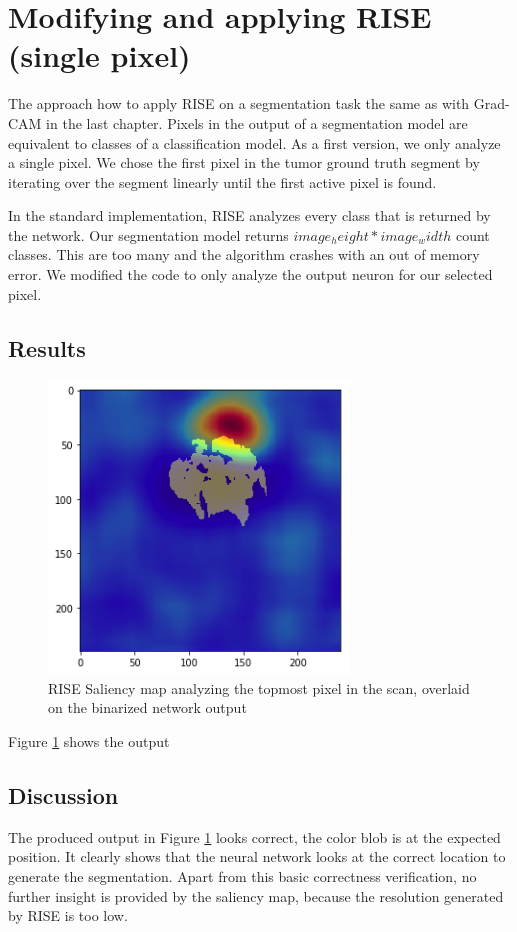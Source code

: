 \section{Modifying and applying RISE (single pixel)}

The approach how to apply RISE on a segmentation task the same as with Grad-CAM in the last chapter. Pixels in the output of a segmentation model are equivalent to classes of a classification model.
As a first version, we only analyze a single pixel. We chose the first pixel in the tumor ground truth segment by iterating over the segment linearly until the first active pixel is found.

In the standard implementation, RISE analyzes every class that is returned by the network. Our segmentation model returns $ image_height * image_width $ count classes. This are too many
and the algorithm crashes with an out of memory error. We modified the code to only analyze the output neuron for our selected pixel.

\subsection{Results}

\begin{figure}[H]
\centering
\includegraphics[width=8cm]{chapters/04_segmentation/images/rise_single_pixel.png}
\caption{RISE Saliency map analyzing the topmost pixel in the scan, overlaid on the binarized network output}
\label{rise_single_pixel_result}
\end{figure}

Figure \ref{rise_single_pixel_result} shows the output 

\subsection{Discussion}
The produced output in Figure \ref{rise_single_pixel_result} looks correct, the color blob is at the expected position. It clearly shows that the neural network looks at the correct location to generate the segmentation.
Apart from this basic correctness verification, no further insight is provided by the saliency map, because the resolution generated by RISE is too low.

